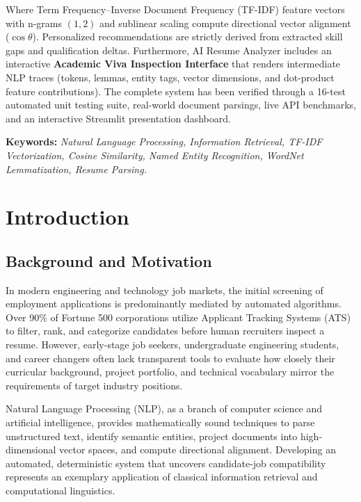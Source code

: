 \documentclass[12pt,a4paper]{report}
\begin{document}
Where Term Frequency–Inverse Document Frequency (TF-IDF) feature vectors with n-grams $(1, 2)$ and sublinear scaling compute directional vector alignment ($\cos\theta$). Personalized recommendations are strictly derived from extracted skill gaps and qualification deltas. Furthermore, AI Resume Analyzer includes an interactive \textbf{Academic Viva Inspection Interface} that renders intermediate NLP traces (tokens, lemmas, entity tags, vector dimensions, and dot-product feature contributions). The complete system has been verified through a 16-test automated unit testing suite, real-world document parsings, live API benchmarks, and an interactive Streamlit presentation dashboard.

\vspace{0.5cm}
\noindent
\textbf{Keywords:} \textit{Natural Language Processing, Information Retrieval, TF-IDF Vectorization, Cosine Similarity, Named Entity Recognition, WordNet Lemmatization, Resume Parsing.}

\newpage
\tableofcontents

\chapter{Introduction}

\section{Background and Motivation}
In modern engineering and technology job markets, the initial screening of employment applications is predominantly mediated by automated algorithms. Over 90\% of Fortune 500 corporations utilize Applicant Tracking Systems (ATS) to filter, rank, and categorize candidates before human recruiters inspect a resume. However, early-stage job seekers, undergraduate engineering students, and career changers often lack transparent tools to evaluate how closely their curricular background, project portfolio, and technical vocabulary mirror the requirements of target industry positions.

Natural Language Processing (NLP), as a branch of computer science and artificial intelligence, provides mathematically sound techniques to parse unstructured text, identify semantic entities, project documents into high-dimensional vector spaces, and compute directional alignment. Developing an automated, deterministic system that uncovers candidate-job compatibility represents an exemplary application of classical information retrieval and computational linguistics.
\end{document}
